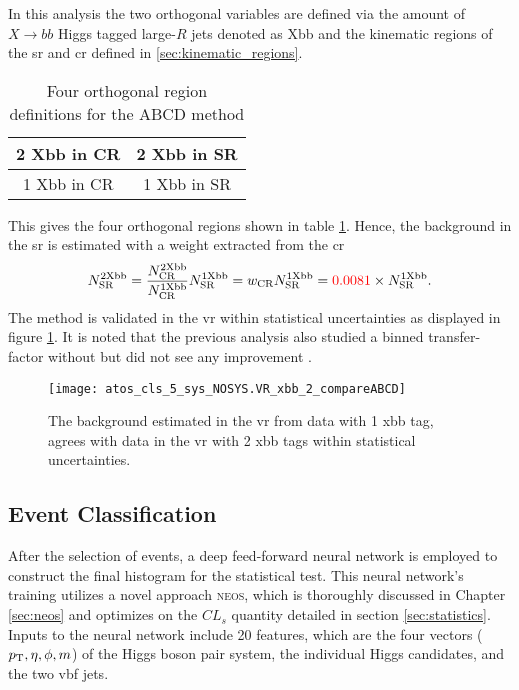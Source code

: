In this analysis the two orthogonal variables are defined via the amount of $X\rightarrow bb$ Higgs tagged large-$R$ jets denoted as Xbb and the kinematic regions of the \ac{sr} and \ac{cr} defined in \ref{sec:kinematic_regions}.
\begin{table}[htbp]
    \centering
    \caption{Four orthogonal region definitions for the ABCD method}
    \begin{tabular}{|c|c|}
        \hline
        2 Xbb in CR & 2 Xbb in SR \\ \hline
        1 Xbb in CR & 1 Xbb in SR \\ \hline
    \end{tabular}
    \label{tab:abcd}
\end{table}
This gives the four orthogonal regions shown in table \ref{tab:abcd}. Hence, the background in the \ac{sr} is estimated with a weight extracted from the \ac{cr}
\begin{equation}
    N_\text{SR}^\text{2Xbb}=\frac{N_\text{CR}^\text{2Xbb}}{N_\text{CR}^\text{1Xbb}} N_\text{SR}^\text{1Xbb} = w_\text{CR} N_\text{SR}^\text{1Xbb}=  \textcolor{red}{0.0081} \times N_\text{SR}^\text{1Xbb}.
\end{equation}
The method is validated in the \ac{vr} within statistical uncertainties as displayed in figure \ref{fig:bkg-validation}. It is noted that the previous analysis also studied a binned transfer-factor without but did not see any improvement \citep{ATL-COM-PHYS-2023-033}.
\begin{figure}
    \centering
    \texttt{[image: atos\_cls\_5\_sys\_NOSYS.VR\_xbb\_2\_compareABCD]}
    \caption[]{The background estimated in the \ac{vr} from data with 1 xbb tag, agrees with data in the \ac{vr} with 2 xbb tags within statistical uncertainties.}
    \label{fig:bkg-validation}
\end{figure}





\subsection{Event Classification}
After the selection of events, a deep feed-forward neural network is employed to construct the final histogram for the statistical test. This neural network's training utilizes a novel approach \textsc{neos}, which is thoroughly discussed in Chapter \ref{sec:neos} and optimizes on the $CL_s$ quantity detailed in section \ref{sec:statistics}. Inputs to the neural network include 20 features, which are the four vectors ($p_{\text{T}},\eta,\phi,m$) of the Higgs boson pair system, the individual Higgs candidates, and the two \ac{vbf} jets.

